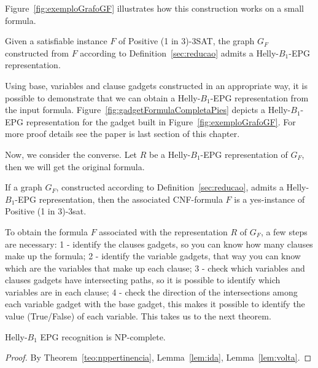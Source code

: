 Figure~\ref{fig:exemploGrafoGF} illustrates how this construction works on a small formula. 




\begin{lemma}\label{lem:ida}
Given a satisfiable instance $F$ of {\sc Positive (1 in 3)-3SAT}, the graph $G_F$ constructed from $F$ according to Definition~\ref{sec:reducao} admits a Helly-$B_1$-EPG representation.
\end{lemma}


Using base, variables and clause gadgets constructed in an appropriate way, it is possible to demonstrate that we can obtain a Helly-$B_1$-EPG representation from the input formula. Figure~\ref{fig:gadgetFormulaCompletaPies} depicts a Helly-$B_1$-EPG representation for the gadget built in Figure~\ref{fig:exemploGrafoGF}. For more proof details see the paper is last section of this chapter.




Now, we consider the converse. Let $R$ be a Helly-$B_1$-EPG representation of $G_F$, then we will get the original formula.


\begin{lemma}\label{lem:volta}
If a graph $G_F$, constructed according to Definition~\ref{sec:reducao}, admits a Helly-$B_1$-EPG representation, then the associated CNF-formula $F$ is a yes-instance of {\sc Positive (1 in 3)-3sat}.
\end{lemma}

To obtain the formula $F$ associated with the  representation $R$ of $G_F$, a few steps are necessary: 1 - identify the  clauses gadgets, so you can know how many clauses make up the formula; 2 - identify the variable gadgets, that way you can know which are the variables that make up each clause; 3 - check which variables and clauses gadgets have intersecting paths, so it is possible to identify which variables are in each clause; 4 - check the direction of the intersections among each variable gadget with the base gadget, this makes it possible to identify the value (True/False) of each variable.  This takes us to the next theorem.

\begin{theorem}
{\sc Helly-$B_1$ EPG recognition} is NP-complete.
\end{theorem}
\begin{proof} %
By Theorem~\ref{teo:nppertinencia}, Lemma~\ref{lem:ida}, Lemma~\ref{lem:volta}.
 \end{proof}



